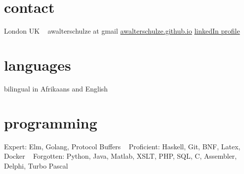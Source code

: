 \documentclass[print]{friggeri-cv-a4} %
\begin{document}

\begin{aside} %
\section{contact}
London
UK
~
awalterschulze at gmail
\href{https://awalterschulze.github.io}{awalterschulze.github.io}
\href{https://za.linkedin.com/in/schulzewalter}{linkedIn profile}
\section{languages}
bilingual in Afrikaans and English
\section{programming}
Expert: 
Elm, Golang, Protocol Buffers
~
Proficient: 
Haskell, Git, BNF, Latex, Docker
~
Forgotten:
Python, Java, Matlab, XSLT, PHP, SQL, C, Assembler, Delphi, Turbo Pascal
\end{aside}
\end{document}
